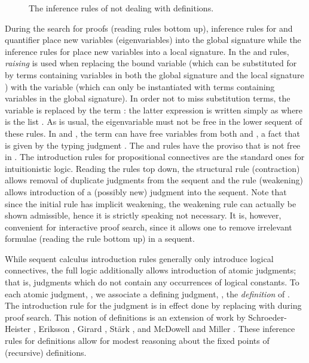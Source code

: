 \documentclass{acmtrans2m}
\begin{document}
\begin{figure}









\caption{The inference rules of  not dealing with definitions.}
\label{fig:core foldnb}
\end{figure}

During the search for proofs (reading rules bottom up), inference rules 
for  and  quantifier place new variables
(eigenvariables) into 
the global signature while the inference rules for  place new
variables into a local signature. 
In the  and  rules, {\em raising} \cite{miller92jsc} is
used when replacing the bound variable  (which can be substituted for by
terms containing variables in both the global signature and the local signature
) with the variable  (which can only be instantiated with
terms containing variables in
the global signature). In order not to miss substitution terms, the
variable  is replaced by the term : the latter
expression is written simply as  where  is the list
.
As is usual, the eigenvariable  must not be free in the lower
sequent of these rules. In  and , the term  can have free
variables from both  and , a fact that is given
by the typing judgment .  
The  and  rules have the proviso that  is 
not free in . The introduction rules for propositional connectives are 
the standard ones for intuitionistic logic. Reading the rules top down, 
the structural rule  (contraction) allows removal of duplicate judgments from the sequent 
and the rule  (weakening) allows introduction of a (possibly new) 
judgment into the sequent. Note that since the initial rule  has 
implicit weakening, the weakening rule  can actually be shown admissible, hence
it is strictly speaking not necessary. It is, however, convenient for interactive proof
search, since it allows one to remove irrelevant formulae (reading the rule bottom up)
in a sequent.

While sequent calculus introduction rules generally only introduce
logical connectives, the full logic  additionally allows introduction
of atomic judgments; that is, judgments which do not contain any
occurrences of logical constants.  To each atomic judgment, , we
associate a defining judgment, , the {\em definition} of
.  The introduction rule for the judgment  is in effect
done by replacing  with  during proof search.  This
notion of definitions is an extension of work by Schroeder-Heister
\citeyear{schroeder-heister93lics}, Eriksson \citeyear{eriksson91elp}, Girard
\citeyear{girard92mail}, St\"ark \citeyear{staerk92jfcs}, and McDowell and
Miller \citeyear{mcdowell00tcs}.  These inference rules for definitions
allow for modest reasoning about the fixed points of (recursive) definitions.
\end{document}
